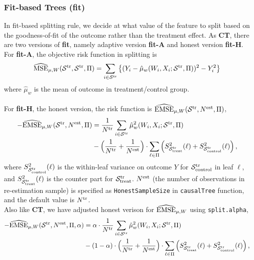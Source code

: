 \documentclass[11pt]{article}
\newcommand{\emse}{{\rm EMSE}}
\newcommand{\est}{{\rm est}}
\newcommand{\calp}{{\Pi}}
\newcommand{\cals}{{\cal S}}
\newcommand{\mse}{{\rm MSE}}
\newcommand{\control}{{\rm control}}
\newcommand{\treat}{{\rm treat}}
\newcommand{\train}{{\rm tr}}
\begin{document}
\subsubsection{Fit-based Trees (\textbf{fit})}
In fit-based splitting rule, we decide at what value of the feature to split based on the goodness-of-fit of the outcome rather than the treatment effect. As \textbf{CT}, there are two versions of \textbf{fit}, namely adaptive version \textbf{fit-A} and honest version \textbf{fit-H}.\\
For \textbf{fit-A}, the objective risk function in splitting is
\[\widehat{\mse}_{\mu, W}(\cals^\train,\cals^\train,\calp) =  \sum_{i\in\cals^\train} \left\{(Y_i-\hat\mu_w(W_i,X_i;\cals^\train,\calp))^2-Y^2_i\right\}\]
where $\hat\mu_w$ is the mean of outcome in treatment/control group.\\
\\
For \textbf{fit-H}, the honest version, the risk function is $\widehat{\emse}_{\mu, W}(\cals^\train, N^\est, \calp)$,
\begin{align*}
-\widehat{\emse}_{\mu, W}(\cals^\train, N^\est, \calp) & =
\frac{1}{N^\train}\sum_{i\in\cals^\train} \hat\mu_w^2(W_i,X_i;\cals^\train,\calp) \\
& -
\Bigl(\frac{1}{N^\train} + \frac{1}{N^\est}\Bigr)\cdot \sum_{\ell\in\calp}
\left( S^2_{\cals^\train_\treat}(\ell)+ S^2_{\cals^\train_\control}(\ell)\right),
\end{align*}
where $S^2_{\cals^\train_\control}(\ell)$ is the within-leaf variance on outcome $Y$ for $\cals^\train_\control$ in leaf $\ell$, and $S^2_{\cals^\train_\treat}(\ell)$ is the counter part for $\cals^\train_\treat$. $N^\est$ (the number of observations in re-estimation sample) is specified as \texttt{HonestSampleSize} in \texttt{causalTree} function, and the default value is $N^\train$.\\
Also like \textbf{CT}, we have adjusted honest verison for $\widehat{\emse}_{\mu, W}$ using \texttt{split.alpha},
\begin{align*}
-\widehat{\emse}_{\mu, W}(\cals^\train, N^\est,\calp, \alpha) & =
\alpha \cdot \frac{1}{N^\train}\sum_{i\in\cals^\train} \hat\mu_w^2(W_i,X_i;\cals^\train,\calp) \\
& - (1 - \alpha) \cdot
\Bigl(\frac{1}{N^\train} + \frac{1}{N^\est}\Bigr)\cdot \sum_{\ell\in\calp}
\left( S^2_{\cals^\train_\treat}(\ell)+ S^2_{\cals^\train_\control}(\ell)\right),
\end{align*}
\end{document}
